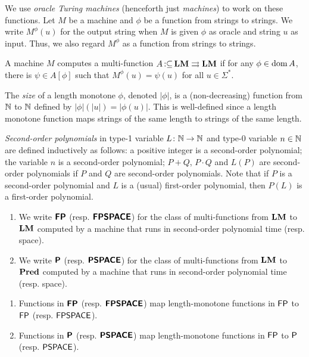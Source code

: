 \documentclass[envcountsame,orivec,oribibl]{llncs}
\newcommand{\pcolon}{\mathpunct{\,:\subseteq}}
\begin{document}
We use \emph{oracle Turing machines} (henceforth just \emph{machines})
to work on these functions.
Let $M$ be a machine and $\phi$ be a function from strings to strings. 
We write $M ^\phi (u)$ for the output string 
when $M$ is given
$\phi$ as oracle and string $u$ as input.
Thus, we also regard $M^\phi$ as a function from strings to strings.


\begin{definition}
 A machine $M$ computes a multi-function $A \pcolon \LM \rightrightarrows \LM$ if for any
 $\phi \in \mathop{\rm dom} A$, there is $\psi \in A[\phi]$ such that $M^\phi(u) = \psi(u)$ for all $u \in \Sigma^*$.
\end{definition}

The \emph{size} of a length monotone $\phi$, denoted $|\phi|$,
is a (non-decreasing) function from $\mathbb N$ to $\mathbb N$ defined by 
$|\phi|(|u|) = |\phi(u)|$.
This is well-defined since a length monotone function maps 
strings of the same length to strings of the same length.

\emph{Second-order polynomials} in type-1 variable $L \colon \mathbb N \to \mathbb N$
and type-0 variable $n \in \mathbb N$ 
are defined inductively as follows:
a positive integer is a second-order polynomial;
the variable $n$ is a second-order polynomial;
$P+Q$, $P \cdot Q$ and $L(P)$ are
second-order polynomials if $P$ and $Q$ are second-order polynomials.
Note that if $P$ is a second-order polynomial and $L$ is a (usual) first-order
polynomial, then $P(L)$ is a first-order polynomial.

\begin{definition}
\begin{enumerate}
 \item We write $\text{\bfseries \sffamily \upshape FP}$ (resp. $\text{\bfseries \sffamily \upshape FPSPACE}$) for the class of
       multi-functions from $\mathbf{LM}$ to $\mathbf{LM}$ computed by a machine that runs
       in second-order polynomial time (resp. space).
 \item We write $\text{\bfseries \sffamily \upshape P}$ (resp. $\text{\bfseries \sffamily \upshape PSPACE}$) for the class of
       multi-functions from $\mathbf{LM}$ to $\mathbf{Pred}$ computed by a machine that runs
       in second-order polynomial time (resp. space).
\end{enumerate}
\end{definition}

\begin{lemma}
 \begin{enumerate}
  \item Functions in $\text{\bfseries \sffamily \upshape FP}$ (resp. $\text{\bfseries \sffamily \upshape FPSPACE}$) map 
	length-monotone functions in $\mathsf{FP}$ to $\mathsf{FP}$ 
	(resp. $\mathsf{FPSPACE}$).
  \item Functions in $\text{\bfseries \sffamily \upshape P}$ (resp. $\text{\bfseries \sffamily \upshape PSPACE}$) map 
	length-monotone functions in $\mathsf{FP}$ to $\mathsf{P}$
	(resp. $\mathsf{PSPACE}$).
 \end{enumerate}
\end{lemma}
\end{document}
